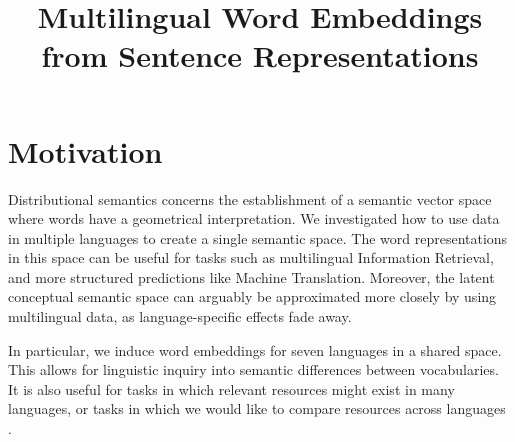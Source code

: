 \documentclass[a4paper,11pt]{article}
\title{Multilingual Word Embeddings from Sentence Representations}
\date{}
\begin{document}
\maketitle
\thispagestyle{empty}
\pagestyle{empty}


\section*{Motivation}


Distributional semantics concerns the establishment of a semantic vector space where words have a geometrical interpretation. We investigated how to use data in multiple languages to create a single semantic space. The word representations in this space can be useful for tasks such as multilingual Information Retrieval, and more structured predictions like Machine Translation. Moreover, the latent conceptual semantic space can arguably be approximated more closely by using multilingual data, as language-specific effects fade away. %

In particular, we induce word embeddings for seven languages in a shared space.  This allows for linguistic inquiry into semantic differences between vocabularies. It is also useful for tasks in which relevant resources might exist in many languages, %
or tasks in which we would like to compare resources across languages%
.




\end{document}

